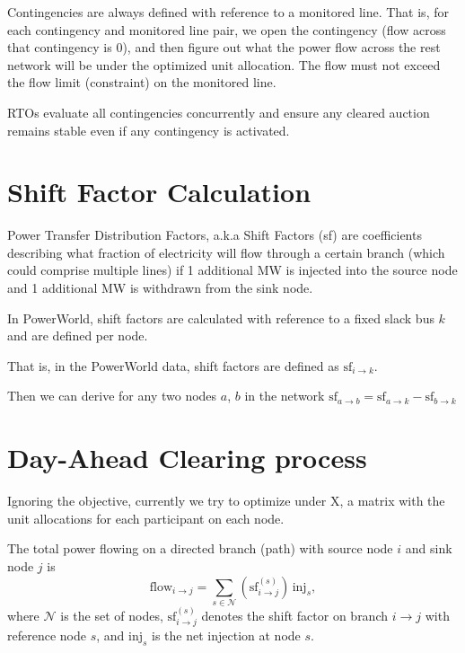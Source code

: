 \documentclass[11pt]{article}
\begin{document}
Contingencies are always defined with reference to a monitored line. That is, for each contingency and monitored line pair, we open the contingency (flow across that contingency is 0), and then figure out what the power flow across the rest network will be under the optimized unit allocation. The flow must not exceed the flow limit (constraint) on the monitored line.




RTOs evaluate all contingencies concurrently and ensure any cleared auction remains stable even if any contingency is activated.

\section{Shift Factor Calculation}
Power Transfer Distribution Factors, a.k.a Shift Factors (sf) are coefficients describing what fraction of electricity will flow through a certain branch (which could comprise multiple lines) if 1 additional MW is injected into the source node and 1 additional MW is withdrawn from the sink node.

In PowerWorld, shift factors are calculated with reference to a fixed slack bus $k$ and are defined per node. 

That is, in the PowerWorld data, shift factors are defined as $\text{sf}_{i \rightarrow k}$. 

Then we can derive for any two nodes $a$, $b$ in the network $\text{sf}_{a \rightarrow b} = \text{sf}_{a \rightarrow k} - \text{sf}_{b \rightarrow k}$

\section{Day-Ahead Clearing process}

Ignoring the objective, currently we try to optimize under X, a matrix with the unit allocations for each participant on each node.

The total power flowing on a directed branch (path) with source node $i$ and sink node $j$ is
\[
  \mathrm{flow}_{i\rightarrow j}
  = \sum_{s\in\mathcal{N}} \left(\mathrm{sf}^{(s)}_{i\rightarrow j}\right)\,\mathrm{inj}_s,
\]
where $\mathcal{N}$ is the set of nodes, $\mathrm{sf}^{(s)}_{i\rightarrow j}$ denotes the shift factor on branch $i\to j$ with reference node $s$, and $\mathrm{inj}_s$ is the net injection at node $s$.
\end{document}
